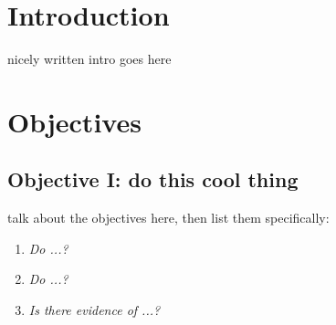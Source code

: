 
\begin{center}
\end{center}
%
%


\section*{Introduction}
 nicely written intro goes here
 

\section*{Objectives}
\subsection*{Objective I: do this cool thing}
talk about the objectives here, then list them specifically:

\begin{enumerate}
\item \emph{Do ...?}
\item \emph{Do ...?}
\item \emph{Is there evidence of ...?}
\end{enumerate}

